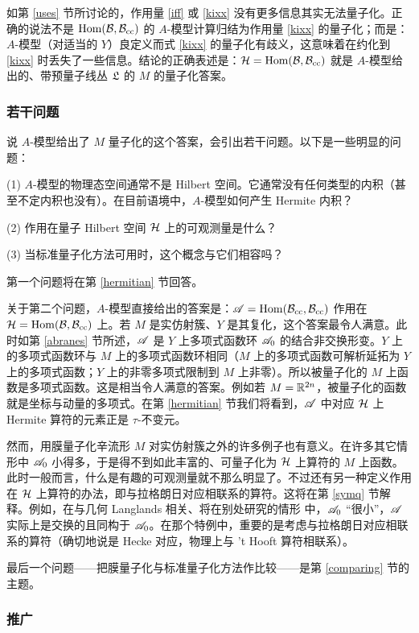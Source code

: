 如第 \ref{uses} 节所讨论的，作用量 \eqref{iff} 或 \eqref{kixx} 没有更多信息其实无法量子化。正确的说法不是 ${\mathrm{Hom}}({\mathcal B},{\mathcal B}_{\mathrm{cc}})$ 的 $A$-模型计算归结为作用量 \eqref{kixx} 的量子化；而是：$A$-模型（对适当的 $Y$）良定义而式 \eqref{kixx} 的量子化有歧义，这意味着在约化到 \eqref{kixx} 时丢失了一些信息。结论的正确表述是：${\mathcal H}={\mathrm{Hom}}({\mathcal B},{\mathcal B}_{\mathrm{cc}})$ 就是 $A$-模型给出的、带预量子线丛 ${\mathfrak L}$ 的 $M$ 的量子化答案。

\subsubsection{若干问题}\label{ques}

说 $A$-模型给出了 $M$ 量子化的这个答案，会引出若干问题。以下是一些明显的问题：

(1) $A$-模型的物理态空间通常不是 Hilbert 空间。它通常没有任何类型的内积（甚至不定内积也没有）。在目前语境中，$A$-模型如何产生 Hermite 内积？

(2) 作用在量子 Hilbert 空间 ${\mathcal H}$ 上的可观测量是什么？

(3) 当标准量子化方法可用时，这个概念与它们相容吗？

第一个问题将在第 \ref{hermitian} 节回答。

关于第二个问题，$A$-模型直接给出的答案是：${\mathscr A}={\mathrm{Hom}}({\mathcal B}_{\mathrm{cc}},{\mathcal B}_{\mathrm{cc}})$ 作用在 ${\mathcal H}={\mathrm{Hom}}({\mathcal B},{\mathcal B}_{\mathrm{cc}})$ 上。若 $M$ 是实仿射簇、$Y$ 是其复化，这个答案最令人满意。此时如第 \ref{abranes} 节所述，${\mathscr A}$ 是 $Y$ 上多项式函数环 ${\mathscr A}_0$ 的结合非交换形变。$Y$ 上的多项式函数环与 $M$ 上的多项式函数环相同（$M$ 上的多项式函数可解析延拓为 $Y$ 上的多项式函数；$Y$ 上的非零多项式限制到 $M$ 上非零）。所以被量子化的 $M$ 上函数是多项式函数。这是相当令人满意的答案。例如若 $M={\mathbb R}^{2n}$，被量子化的函数就是坐标与动量的多项式。在第 \ref{hermitian} 节我们将看到，${\mathscr A}$ 中对应 ${\mathcal H}$ 上 Hermite 算符的元素正是 $\tau$-不变元。

然而，用膜量子化辛流形 $M$ 对实仿射簇之外的许多例子也有意义。在许多其它情形中 ${\mathscr A}_0$ 小得多，于是得不到如此丰富的、可量子化为 ${\mathcal H}$ 上算符的 $M$ 上函数。此时一般而言，什么是有趣的可观测量就不那么明显了。不过还有另一种定义作用在 ${\mathcal H}$ 上算符的办法，即与拉格朗日对应相联系的算符。这将在第 \ref{symq} 节解释。例如，在与几何 Langlands 相关、将在别处研究的情形 \cite{GaW} 中，${\mathscr A}_0$ “很小”，${\mathscr A}$ 实际上是交换的且同构于 ${\mathscr A}_0$。在那个特例中，重要的是考虑与拉格朗日对应相联系的算符（确切地说是 Hecke 对应，物理上与 't Hooft 算符相联系）。

最后一个问题——把膜量子化与标准量子化方法作比较——是第 \ref{comparing} 节的主题。

\subsubsection{推广}\label{genera}

